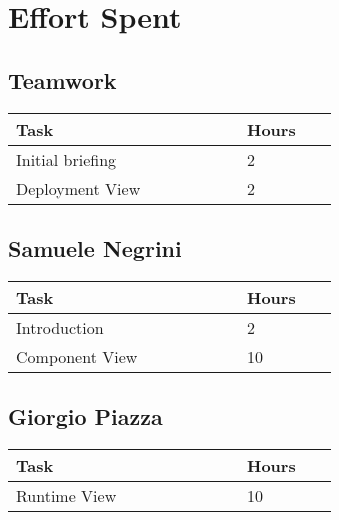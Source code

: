 \chapter{Effort Spent}

\section{Teamwork}
\vspace{2mm}
\begin{center}
    \begin{tabular}{@{}p{0.5\linewidth} p{0.2\linewidth}@{}}
        \hline
        \textbf{Task} & \textbf{Hours} \\ \hline
        Initial briefing & 2 \\ \hline
        Deployment View & 2 \\ \hline
    \end{tabular}
\end{center}

\section{Samuele Negrini}
\vspace{2mm}
\begin{center}
	\begin{tabular}{@{}p{0.5\linewidth} p{0.2\linewidth}@{}}
		\hline
		\textbf{Task} & \textbf{Hours} \\ \hline
		Introduction & 2 \\ \hline
		Component View & 10 \\ \hline
	\end{tabular}
\end{center}

\section{Giorgio Piazza}
\vspace{2mm}
\begin{center}
	\begin{tabular}{@{}p{0.5\linewidth} p{0.2\linewidth}@{}}
		\hline
		\textbf{Task} & \textbf{Hours} \\ \hline
		Runtime View & 10 \\ \hline
	\end{tabular}
\end{center}